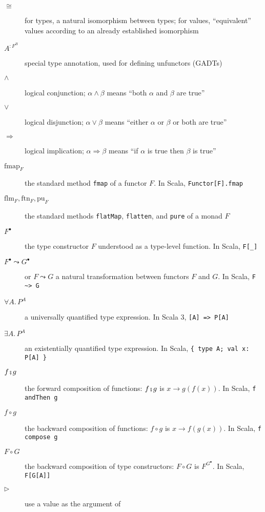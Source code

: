 \begin{description}
\item [{$\cong$}] \textemdash{} for types, a natural isomorphism between
types; for values, \textsf{``}equivalent\textsf{''} values according to an already
established isomorphism
\item [{$A^{:F^{B}}$}] \textemdash{} special type annotation, used for
defining unfunctors (GADTs)
\item [{$\wedge$}] \textemdash{} logical conjunction; $\alpha\wedge\beta$
means \textsf{``}both $\alpha$ and $\beta$ are true\textsf{''}
\item [{$\vee$}] \textemdash{} logical disjunction; $\alpha\vee\beta$
means \textsf{``}either $\alpha$ or $\beta$ or both are true\textsf{''}
\item [{$\Rightarrow$}] \textemdash{} logical implication; $\alpha\Rightarrow\beta$
means \textsf{``}if $\alpha$ is true then $\beta$ is true\textsf{''}
\item [{$\text{fmap}_{F}$}] \textemdash{} the standard method \lstinline!fmap!
of a functor $F$. In Scala, \lstinline!Functor[F].fmap!
\item [{$\text{flm}_{F},\text{ftn}_{F},\text{pu}_{F}$}] \textemdash{}
the standard methods \lstinline!flatMap!, \lstinline!flatten!, and
\lstinline!pure! of a monad $F$
\item [{$F^{\bullet}$}] \textemdash{} the type constructor $F$ understood
as a type-level function. In Scala, \lstinline!F[_]! 
\item [{$F^{\bullet}\leadsto G^{\bullet}$}] \textemdash{} or $F\leadsto G$
a natural transformation between functors $F$ and $G$. In Scala,
\lstinline!F ~> G!
\item [{$\forall A.\,P^{A}$}] \textemdash{} a universally quantified type
expression. In Scala 3, \lstinline![A] => P[A]!
\item [{$\exists A.\,P^{A}$}] \textemdash{} an existentially quantified
type expression. In Scala, \lstinline!{ type A; val x: P[A] }! 
\item [{$f\bef g$}] \textemdash{} the forward composition of functions:
$f\bef g$ is $x\rightarrow g(f(x))$. In Scala, \lstinline!f andThen g!
\item [{$f\circ g$}] \textemdash{} the backward composition of functions:
$f\circ g$ is $x\rightarrow f(g(x))$. In Scala, \lstinline!f compose g!
\item [{$F\circ G$}] \textemdash{} the backward composition of type constructors:
$F\circ G$ is $F^{G^{\bullet}}$. In Scala, \lstinline!F[G[A]]! 
\item [{$\triangleright$}] \textemdash{} use a value as the argument of

\end{description}
